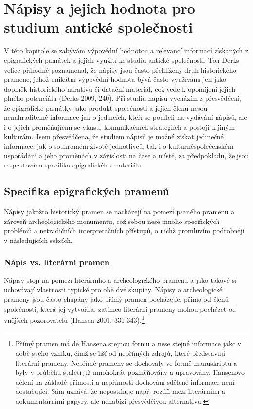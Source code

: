 \chapter{}
\chapter{\crlf
}
\chapter{Nápisy a jejich hodnota pro studium antické společnosti}
V této kapitole se zabývám výpovědní hodnotou a relevancí informací získaných z epigrafických památek a jejich využití ke studiu antické společnosti. Ton Derks velice příhodně poznamenal, že nápisy jsou často přehlížený druh historického pramene, jehož unikátní výpovědní hodnota bývá často využívána jen jako doplněk historického narativu či datační materiál, což vede k opomíjení jejich plného potenciálu (Derks 2009, 240). Při studiu nápisů vycházím z přesvědčení, že epigrafické památky jako produkt společnosti a jejich členů nesou nenahraditelné informace jak o jedincích, kteří se podíleli na vydávání nápisů, ale i o jejich proměňujícím se vkusu, komunikačních strategiích a postoji k jiným kulturám. Jsem přesvědčena, že studiem nápisů je možné získat jedinečné informace, jak o soukromém životě jednotlivců, tak i o kulturněspolečenském uspořádání a jeho proměnách v závislosti na čase a místě, za předpokladu, že jsou respektována specifika epigrafického materiálu.

\section[specifika-epigrafických-pramenů]{Specifika epigrafických pramenů}

Nápisy jakožto historický pramen se nacházejí na pomezí psaného pramenu a zároveň archeologického monumentu, což sebou nese mnoho specifických problémů a netradičních interpretačních přístupů, o nichž promluvím podrobněji v následujících sekcích.

\subsection[nápis-vs.-literární-pramen]{Nápis vs. literární pramen}

Nápisy stojí na pomezí literárního a archeologického pramenu a jako takové si uchovávají vlastnosti typické pro obě dvě skupiny. Nápisy a archeologické prameny jsou často chápány jako přímý pramen pocházející přímo od členů společnosti, která jej vytvořila, zatímco literární prameny mohou pocházet od vnějších pozorovatelů (Hansen 2001, 331-343).\footnote{Přímý pramen má de Hansena stejnou formu a nese stejné informace jako v době svého vzniku, čímž se liší od nepřímých zdrojů, které představují literární prameny. Nepřímé prameny se dochovaly ve formě manuskriptů a byly v průběhu staletí již mnohokrát pozměňovány a upravovány. Hansenovo dělení na základě přímosti a nepřímosti dochování sdělené informace není dostačující. Sám uznává, že nepostihuje např. rozdíl mezi literárními a dokumentárními papyry, ale nenabízí přesvědčivou alternativu.}

